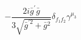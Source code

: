 %
\begin{dmath*}
%
  -  \frac{2 i {\bar g}^\prime {\bar g}{}}{3 \sqrt{{\bar g}^{\prime 2} + {\bar g}{}^2}}\delta_{f_1 f_2}  \gamma^{\mu_3}
%
\end{dmath*}
%
